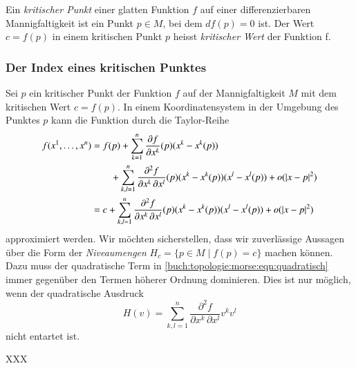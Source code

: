 \begin{definition}
%
%
%
%
Ein \emph{kritischer Punkt} einer glatten Funktion $f$ auf einer
differenzierbaren Mannigfaltigkeit ist ein Punkt $p\in M$, bei dem
$df(p)=0$ ist.
Der Wert $c=f(p)$ in einem kritischen Punkt $p$ heisst
\emph{kritischer Wert} der Funktion f.
\end{definition}

%
%
\subsubsection{Der Index eines kritischen Punktes}
Sei $p$ ein kritischer Punkt der Funktion $f$ auf der Mannigfaltigkeit $M$
mit dem kritischen Wert $c=f(p)$.
In einem Koordinatensystem in der Umgebung des Punktes $p$ kann die Funktion
durch die Taylor-Reihe 
\begin{align}
f(x^1,\dots,x^n)
&=
f(p)
+
\sum_{k=1}^n \frac{\partial f}{\partial x^k}(p) (x^k-x^k(p))
\\
&\qquad\mathstrut
+
\sum_{k,l=1}^n
\frac{\partial^2 f}{\partial x^k\,\partial x^l}(p)
(x^k-x^k(p))(x^l-x^l(p))
+
o(|x-p|^2)
\notag
\\
&=
c
+
\sum_{k,l=1}^n
\frac{\partial^2 f}{\partial x^k\,\partial x^l}(p)
(x^k-x^k(p))(x^l-x^l(p))
+
o(|x-p|^2)
\label{buch:topologie:morse:eqn:quadratisch}
\end{align}
approximiert werden.
Wir möchten sicherstellen, dass wir zuverlässige Aussagen über die
Form der \emph{Niveaumengen} $H_c=\{p\in M\mid f(p)=c\}$ machen können.
Dazu muss der quadratische Term in
\eqref{buch:topologie:morse:eqn:quadratisch}
immer gegenüber den Termen höherer Ordnung dominieren.
Dies ist nur möglich, wenn der quadratische Ausdruck
\[
H(v)
=
\sum_{k,l=1}^n
\frac{\partial^2 f}{\partial x^k\,\partial x^l}
v^k v^l
\]
nicht entartet ist.

\begin{definition}
XXX
\end{definition}

